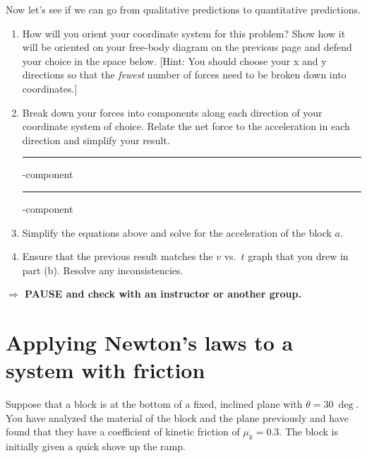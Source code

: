 \documentclass[12pt,hidelinks]{article}
\newcommand{\checkin}{{\bf \noindent $\Rightarrow$ PAUSE and check with an instructor or another
  group.}}
\begin{document}
\noindent
Now let's see if we can go from qualitative predictions to quantitative predictions.
\begin{enumerate}[resume]
  \item How will you orient your coordinate system for this problem? Show how it will be
  oriented on your free-body diagram on the previous page and defend your choice in the space
  below. [Hint: You should choose your x and y directions so that the \textit{fewest} number of
  forces need to be broken down into coordinates.] \vspace{1in}
  \item Break down your forces into components along each direction of your coordinate system
  of choice.  Relate the net force to the acceleration in each direction and simplify your
  result. \vspace{0.1in}

  \rule{0.5in}{0.5pt}-component \hspace{0.35\textwidth} \rule{0.5in}{0.5pt}-component
  \vspace{2in}
  \item Simplify the equations above and solve for the acceleration of the block $a$.
  \vspace{2in}
  \item Ensure that the previous result matches the $v$ vs.\ $t$ graph that you drew in part
  (b). Resolve any inconsistencies.
\end{enumerate}
\vfill \checkin
\newpage
\section{Applying Newton's laws to a system with friction}
Suppose that a block is at the bottom of a fixed, inclined plane with $\theta=\SI{30}{\deg}$.
You have analyzed the material of the block and the plane previously and have found that they
have a coefficient of kinetic friction of $\mu_k = 0.3$. The block is initially given a quick
shove up the ramp.
\end{document}
